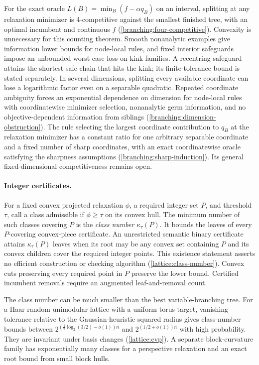 For the exact oracle $L(B)=\min_B(f-\alpha q_B)$ on an interval,
splitting at any relaxation minimizer is 4-competitive against the smallest
finished tree, with an optimal incumbent and continuous $f$
(\cref{branching:four-competitive}). Convexity is unnecessary for this
counting theorem.
Smooth nonanalytic examples give information lower bounds for node-local
rules, and fixed interior safeguards impose an unbounded worst-case loss on
kink families. A recentring safeguard attains the shortest safe chain that
hits the kink; its finite-tolerance bound is stated separately. In several
dimensions, splitting every available coordinate can lose a logarithmic
factor even on a separable quadratic. Repeated coordinate ambiguity forces
an exponential dependence on dimension for node-local rules with
coordinatewise minimizer selection, nonanalytic germ information, and no
objective-dependent information from siblings
(\cref{branching:dimension-obstruction}). The rule selecting the largest
coordinate contribution to $q_B$ at the relaxation minimizer has a constant
ratio for one arbitrary separable coordinate and a fixed number of sharp
coordinates, with an exact coordinatewise oracle satisfying the sharpness
assumptions (\cref{branching:sharp-induction}). Its general
fixed-dimensional competitiveness remains open.

\paragraph{Integer certificates.}
For a fixed convex projected relaxation $\phi$, a required integer set
$P$, and threshold $\tau$, call a class admissible if $\phi\geq\tau$
on its convex hull. The minimum number of such classes covering $P$ is the
\emph{class number} $\kappa_\tau(P)$. It bounds the leaves of every
$P$-covering convex-piece certificate. An unrestricted semantic binary
certificate attains $\kappa_\tau(P)$ leaves when its root may be any convex
set containing $P$ and its convex children cover the required integer
points. This existence statement asserts no efficient construction or
checking algorithm (\cref{lattice:class-number}). Convex cuts preserving
every required point in $P$ preserve the lower bound. Certified incumbent removals require an augmented
leaf-and-removal count.

The class number can be much smaller than the best variable-branching
tree. For a Haar random unimodular lattice with a uniform torus target, vanishing tolerance relative
to the Gaussian-heuristic squared radius gives class-number bounds between
$2^{(\frac12\log_2(3/2)-o(1))n}$ and $2^{(1/2+o(1))n}$ with high probability.
They are invariant under basis changes (\cref{lattice:cvp}). A separate
block-curvature family
has exponentially many classes for a perspective relaxation and an exact
root bound from small block hulls.

